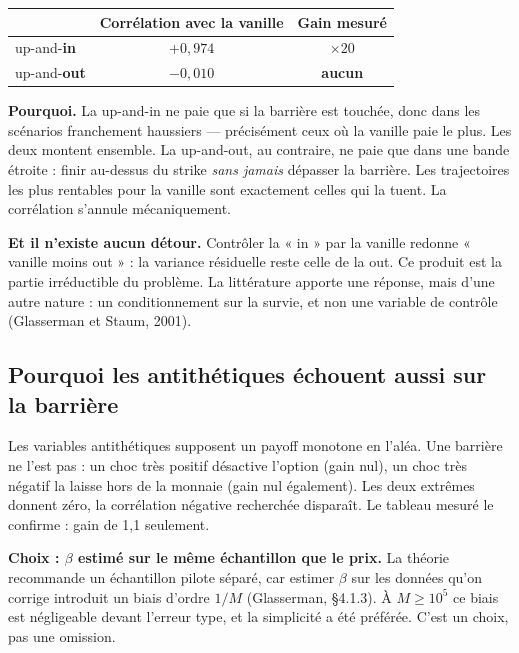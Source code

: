 \documentclass[11pt,a4paper]{article}
\begin{document}
\begin{center}
\small
\begin{tabular}{lcc}
\toprule
& Corrélation avec la vanille & Gain mesuré \\
\midrule
up-and-\textbf{in}  & $+0{,}974$ & $\times 20$ \\
up-and-\textbf{out} & $-0{,}010$ & \textbf{aucun} \\
\bottomrule
\end{tabular}
\end{center}

\textbf{Pourquoi.} La up-and-in ne paie que si la barrière est touchée, donc
dans les scénarios franchement haussiers --- précisément ceux où la vanille paie
le plus. Les deux montent ensemble. La up-and-out, au contraire, ne paie que
dans une bande étroite : finir au-dessus du strike \emph{sans jamais} dépasser
la barrière. Les trajectoires les plus rentables pour la vanille sont
exactement celles qui la tuent. La corrélation s'annule mécaniquement.

\textbf{Et il n'existe aucun détour.} Contrôler la « in » par la vanille redonne
« vanille moins out » : la variance résiduelle reste celle de la out. Ce produit
est la partie irréductible du problème. La littérature apporte une réponse,
mais d'une autre nature : un conditionnement sur la survie, et non une variable
de contrôle (Glasserman et Staum, 2001).

\subsection{Pourquoi les antithétiques échouent aussi sur la barrière}

Les variables antithétiques supposent un payoff monotone en l'aléa. Une
barrière ne l'est pas : un choc très positif désactive l'option (gain nul), un
choc très négatif la laisse hors de la monnaie (gain nul également). Les deux
extrêmes donnent zéro, la corrélation négative recherchée disparaît. Le tableau
mesuré le confirme : gain de 1,1 seulement.

\begin{choix}
\textbf{Choix : $\beta$ estimé sur le même échantillon que le prix.} La théorie
recommande un échantillon pilote séparé, car estimer $\beta$ sur les données
qu'on corrige introduit un biais d'ordre $1/M$ (Glasserman, \S 4.1.3). À
$M \geq 10^5$ ce biais est négligeable devant l'erreur type, et la simplicité a
été préférée. C'est un choix, pas une omission.
\end{choix}
\end{document}

